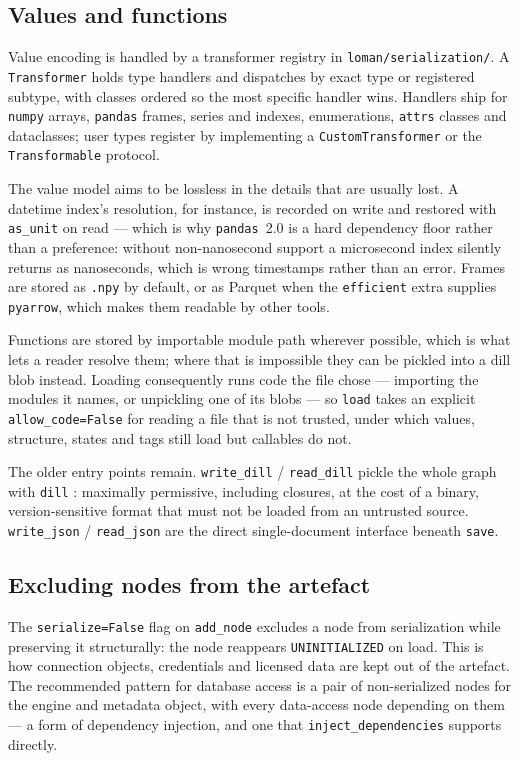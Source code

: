 \documentclass[11pt,a4paper]{article}
\newcommand{\code}[1]{\texttt{#1}}
\begin{document}
\subsection{Values and functions}

Value encoding is handled by a transformer registry in
\code{loman/serialization/}. A \code{Transformer} holds type handlers and
dispatches by exact type or registered subtype, with classes ordered so the
most specific handler wins. Handlers ship for \code{numpy} \cite{numpy} arrays,
\code{pandas} \cite{pandas} frames, series and indexes, enumerations,
\code{attrs} classes and dataclasses; user types register by implementing a
\code{CustomTransformer} or the \code{Transformable} protocol.

The value model aims to be lossless in the details that are usually lost. A
datetime index's resolution, for instance, is recorded on write and restored
with \code{as\_unit} on read --- which is why \code{pandas}~2.0 is a hard
dependency floor rather than a preference: without non-nanosecond support a
microsecond index silently returns as nanoseconds, which is wrong timestamps
rather than an error. Frames are stored as \code{.npy} by default, or as
Parquet when the \code{efficient} extra supplies \code{pyarrow}, which makes
them readable by other tools.

Functions are stored by importable module path wherever possible, which is what
lets a reader resolve them; where that is impossible they can be pickled into a
dill blob instead. Loading consequently runs code the file chose --- importing
the modules it names, or unpickling one of its blobs --- so \code{load} takes an
explicit \code{allow\_code=False} for reading a file that is not trusted, under
which values, structure, states and tags still load but callables do not.

The older entry points remain. \code{write\_dill} / \code{read\_dill} pickle the
whole graph with \code{dill} \cite{dill}: maximally permissive, including
closures, at the cost of a binary, version-sensitive format that must not be
loaded from an untrusted source. \code{write\_json} / \code{read\_json} are the
direct single-document interface beneath \code{save}.

\subsection{Excluding nodes from the artefact}

The \code{serialize=False} flag on \code{add\_node} excludes a node from
serialization while preserving it structurally: the node reappears
\code{UNINITIALIZED} on load. This is how connection objects, credentials and
licensed data are kept out of the artefact. The recommended pattern for
database access is a pair of non-serialized nodes for the engine and metadata
object, with every data-access node depending on them --- a form of dependency
injection, and one that \code{inject\_dependencies} supports directly.
\end{document}
